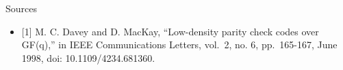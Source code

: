 \documentclass[10pt,ignorenonframetext,]{beamer}
\providecommand{\tightlist}{%
  \setlength{\itemsep}{0pt}\setlength{\parskip}{0pt}}
\begin{document}
\begin{frame}{Sources}
\protect\hypertarget{sources}{}
\begin{itemize}[<+->]
\tightlist
\item
  {[}1{]} M. C. Davey and D. MacKay, ``Low-density parity check codes
  over GF(q),'' in IEEE Communications Letters, vol.~2, no. 6,
  pp.~165-167, June 1998, doi: 10.1109/4234.681360.
\end{itemize}
\end{frame}
\end{document}
